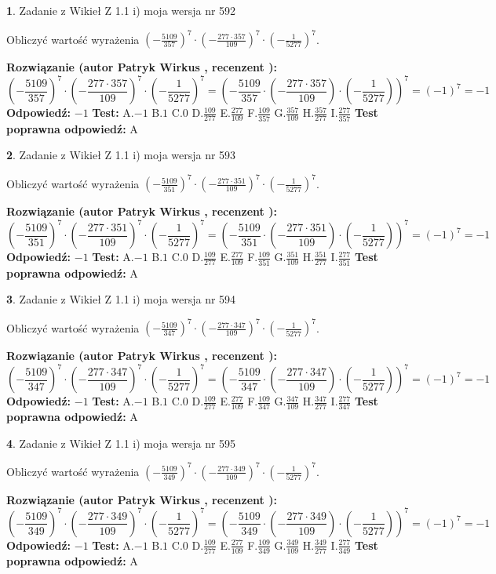 \documentclass[12pt, a4paper]{article}
\theoremstyle{definition} %
\newtheorem{zad}{}
\newcommand{\zadStart}[1]{\begin{zad}#1\newline}
\newcommand{\zadStop}{\end{zad}}
\newcommand{\rozwStart}[2]{\noindent \textbf{Rozwiązanie (autor #1 , recenzent #2): }\newline}
\newcommand{\rozwStop}{\newline}
\newcommand{\odpStart}{\noindent \textbf{Odpowiedź:}\newline}
\newcommand{\odpStop}{\newline}
\newcommand{\testStart}{\noindent \textbf{Test:}\newline}
\newcommand{\testStop}{\newline}
\newcommand{\kluczStart}{\noindent \textbf{Test poprawna odpowiedź:}\newline}
\newcommand{\kluczStop}{\newline}
\begin{document}
\zadStart{Zadanie z Wikieł Z 1.1 i) moja wersja nr 592}

Obliczyć wartość wyrażenia $(-\frac{5109}{357})^{7} \cdot (-\frac{277 \cdot 357}{109})^{7} \cdot (-\frac{1}{5277})^{7}$.
\zadStop
\rozwStart{Patryk Wirkus}{}
$$(-\frac{5109}{357})^{7} \cdot (-\frac{277 \cdot 357}{109})^{7} \cdot (-\frac{1}{5277})^{7} = (-\frac{5109}{357} \cdot (-\frac{277 \cdot 357}{109}) \cdot (-\frac{1}{5277}))^{7} = (-1)^{7} = -1$$
\rozwStop
\odpStart
$-1$
\odpStop
\testStart
A.$-1$ B.$1$ C.$0$ D.$\frac{109}{277}$ E.$\frac{277}{109}$
F.$\frac{109}{357}$ G.$\frac{357}{109}$
H.$\frac{357}{277}$
I.$\frac{277}{357}$
\testStop
\kluczStart
A
\kluczStop



\zadStart{Zadanie z Wikieł Z 1.1 i) moja wersja nr 593}

Obliczyć wartość wyrażenia $(-\frac{5109}{351})^{7} \cdot (-\frac{277 \cdot 351}{109})^{7} \cdot (-\frac{1}{5277})^{7}$.
\zadStop
\rozwStart{Patryk Wirkus}{}
$$(-\frac{5109}{351})^{7} \cdot (-\frac{277 \cdot 351}{109})^{7} \cdot (-\frac{1}{5277})^{7} = (-\frac{5109}{351} \cdot (-\frac{277 \cdot 351}{109}) \cdot (-\frac{1}{5277}))^{7} = (-1)^{7} = -1$$
\rozwStop
\odpStart
$-1$
\odpStop
\testStart
A.$-1$ B.$1$ C.$0$ D.$\frac{109}{277}$ E.$\frac{277}{109}$
F.$\frac{109}{351}$ G.$\frac{351}{109}$
H.$\frac{351}{277}$
I.$\frac{277}{351}$
\testStop
\kluczStart
A
\kluczStop



\zadStart{Zadanie z Wikieł Z 1.1 i) moja wersja nr 594}

Obliczyć wartość wyrażenia $(-\frac{5109}{347})^{7} \cdot (-\frac{277 \cdot 347}{109})^{7} \cdot (-\frac{1}{5277})^{7}$.
\zadStop
\rozwStart{Patryk Wirkus}{}
$$(-\frac{5109}{347})^{7} \cdot (-\frac{277 \cdot 347}{109})^{7} \cdot (-\frac{1}{5277})^{7} = (-\frac{5109}{347} \cdot (-\frac{277 \cdot 347}{109}) \cdot (-\frac{1}{5277}))^{7} = (-1)^{7} = -1$$
\rozwStop
\odpStart
$-1$
\odpStop
\testStart
A.$-1$ B.$1$ C.$0$ D.$\frac{109}{277}$ E.$\frac{277}{109}$
F.$\frac{109}{347}$ G.$\frac{347}{109}$
H.$\frac{347}{277}$
I.$\frac{277}{347}$
\testStop
\kluczStart
A
\kluczStop



\zadStart{Zadanie z Wikieł Z 1.1 i) moja wersja nr 595}

Obliczyć wartość wyrażenia $(-\frac{5109}{349})^{7} \cdot (-\frac{277 \cdot 349}{109})^{7} \cdot (-\frac{1}{5277})^{7}$.
\zadStop
\rozwStart{Patryk Wirkus}{}
$$(-\frac{5109}{349})^{7} \cdot (-\frac{277 \cdot 349}{109})^{7} \cdot (-\frac{1}{5277})^{7} = (-\frac{5109}{349} \cdot (-\frac{277 \cdot 349}{109}) \cdot (-\frac{1}{5277}))^{7} = (-1)^{7} = -1$$
\rozwStop
\odpStart
$-1$
\odpStop
\testStart
A.$-1$ B.$1$ C.$0$ D.$\frac{109}{277}$ E.$\frac{277}{109}$
F.$\frac{109}{349}$ G.$\frac{349}{109}$
H.$\frac{349}{277}$
I.$\frac{277}{349}$
\testStop
\kluczStart
A
\kluczStop
\end{document}
